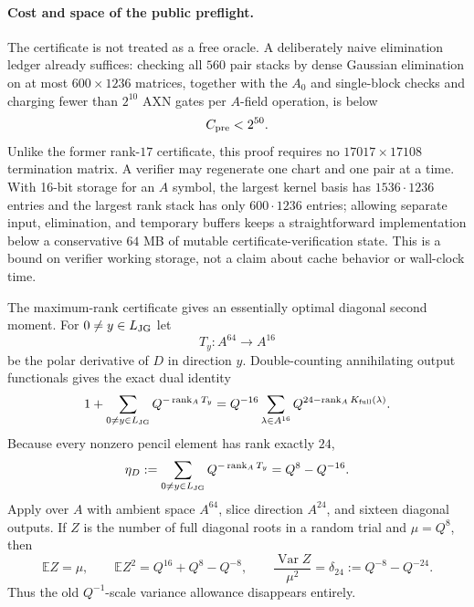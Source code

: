\documentclass[11pt]{article}
\newcommand{\rank}{\operatorname{rank}}
\begin{document}
\paragraph{Cost and space of the public preflight.}
The certificate is not treated as a free oracle.  A deliberately naive
elimination ledger already suffices: checking all $560$ pair stacks by dense
Gaussian elimination on at most $600\times1236$ matrices, together with the
$A_0$ and single-block checks and charging fewer than $2^{10}$ AXN gates per
$A$-field operation, is below
\begin{equation}
  C_{\rm pre}<2^{50}.                                \label{eq:jg-preflight-cost}
\end{equation}
Unlike the former rank-$17$ certificate, this proof requires no
$17017\times17108$ termination matrix.  A verifier may regenerate one chart
and one pair at a time.  With 16-bit storage for an $A$ symbol, the largest
kernel basis has $1536\cdot1236$ entries and the largest rank stack has only
$600\cdot1236$ entries; allowing separate input, elimination, and temporary
buffers keeps a straightforward implementation below a conservative $64$ MB
of mutable certificate-verification state.  This is a bound on verifier
working storage, not a claim about cache behavior or wall-clock time.

The maximum-rank certificate gives an essentially optimal diagonal second
moment.  For $0\ne y\in L_{\rm JG}$ let
\[
  T_y:A^{64}\to A^{16}
\]
be the polar derivative of $D$ in direction $y$.  Double-counting annihilating
output functionals gives the exact dual identity
\begin{equation}
  1+\sum_{0\ne y\in L_{\rm JG}}Q^{-\rank_A T_y}
  =Q^{-16}\sum_{\lambda\in A^{16}}
       Q^{24-\rank_A K_{\rm full}(\lambda)}.         \label{eq:jg-dual-rank-identity}
\end{equation}
Because every nonzero pencil element has rank exactly $24$,
\begin{equation}
 \eta_D:=\sum_{0\ne y\in L_{\rm JG}}Q^{-\rank_A T_y}
 = Q^8-Q^{-16}.                                      \label{eq:jg-eta}
\end{equation}
Apply  over $A$ with ambient space $A^{64}$,
slice direction $A^{24}$, and sixteen diagonal outputs.  If $Z$ is the number
of full diagonal roots in a random trial and $\mu=Q^8$, then
\begin{equation}
 \mathbb EZ=\mu,\qquad
 \mathbb EZ^2=Q^{16}+Q^8-Q^{-8},\qquad
 \frac{\operatorname{Var}Z}{\mu^2}
 =\delta_{24}:=Q^{-8}-Q^{-24}.                       \label{eq:jg-variance}
\end{equation}
Thus the old $Q^{-1}$-scale variance allowance disappears entirely.
\end{document}

